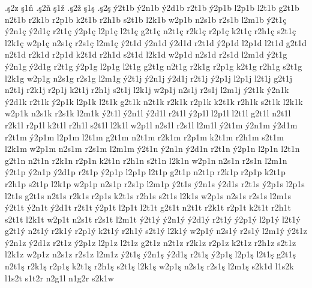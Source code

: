 {.ş2z
ş1ň
.ş2ň
ş1ž
.ş2ž
ş1ş
.ş2ş
ý2t1b
ý2n1b
ý2d1b
r2t1b
ý2p1b
l2p1b
l2t1b
g2t1b
n2t1b
r2k1b
r2p1b
k2t1b
r2h1b
s2t1b
l2k1b
w2p1b
n2s1b
r2s1b
l2m1b
ý2t1ç
ý2n1ç
ý2d1ç
r2t1ç
ý2p1ç
l2p1ç
l2t1ç
g2t1ç
n2t1ç
r2k1ç
r2p1ç
k2t1ç
r2h1ç
s2t1ç
l2k1ç
w2p1ç
n2s1ç
r2s1ç
l2m1ç
ý2t1d
ý2n1d
ý2d1d
r2t1d
ý2p1d
l2p1d
l2t1d
g2t1d
n2t1d
r2k1d
r2p1d
k2t1d
r2h1d
s2t1d
l2k1d
w2p1d
n2s1d
r2s1d
l2m1d
ý2t1g
ý2n1g
ý2d1g
r2t1g
ý2p1g
l2p1g
l2t1g
g2t1g
n2t1g
r2k1g
r2p1g
k2t1g
r2h1g
s2t1g
l2k1g
w2p1g
n2s1g
r2s1g
l2m1g
ý2t1j
ý2n1j
ý2d1j
r2t1j
ý2p1j
l2p1j
l2t1j
g2t1j
n2t1j
r2k1j
r2p1j
k2t1j
r2h1j
s2t1j
l2k1j
w2p1j
n2s1j
r2s1j
l2m1j
ý2t1k
ý2n1k
ý2d1k
r2t1k
ý2p1k
l2p1k
l2t1k
g2t1k
n2t1k
r2k1k
r2p1k
k2t1k
r2h1k
s2t1k
l2k1k
w2p1k
n2s1k
r2s1k
l2m1k
ý2t1l
ý2n1l
ý2d1l
r2t1l
ý2p1l
l2p1l
l2t1l
g2t1l
n2t1l
r2k1l
r2p1l
k2t1l
r2h1l
s2t1l
l2k1l
w2p1l
n2s1l
r2s1l
l2m1l
ý2t1m
ý2n1m
ý2d1m
r2t1m
ý2p1m
l2p1m
l2t1m
g2t1m
n2t1m
r2k1m
r2p1m
k2t1m
r2h1m
s2t1m
l2k1m
w2p1m
n2s1m
r2s1m
l2m1m
ý2t1n
ý2n1n
ý2d1n
r2t1n
ý2p1n
l2p1n
l2t1n
g2t1n
n2t1n
r2k1n
r2p1n
k2t1n
r2h1n
s2t1n
l2k1n
w2p1n
n2s1n
r2s1n
l2m1n
ý2t1p
ý2n1p
ý2d1p
r2t1p
ý2p1p
l2p1p
l2t1p
g2t1p
n2t1p
r2k1p
r2p1p
k2t1p
r2h1p
s2t1p
l2k1p
w2p1p
n2s1p
r2s1p
l2m1p
ý2t1s
ý2n1s
ý2d1s
r2t1s
ý2p1s
l2p1s
l2t1s
g2t1s
n2t1s
r2k1s
r2p1s
k2t1s
r2h1s
s2t1s
l2k1s
w2p1s
n2s1s
r2s1s
l2m1s
ý2t1t
ý2n1t
ý2d1t
r2t1t
ý2p1t
l2p1t
l2t1t
g2t1t
n2t1t
r2k1t
r2p1t
k2t1t
r2h1t
s2t1t
l2k1t
w2p1t
n2s1t
r2s1t
l2m1t
ý2t1ý
ý2n1ý
ý2d1ý
r2t1ý
ý2p1ý
l2p1ý
l2t1ý
g2t1ý
n2t1ý
r2k1ý
r2p1ý
k2t1ý
r2h1ý
s2t1ý
l2k1ý
w2p1ý
n2s1ý
r2s1ý
l2m1ý
ý2t1z
ý2n1z
ý2d1z
r2t1z
ý2p1z
l2p1z
l2t1z
g2t1z
n2t1z
r2k1z
r2p1z
k2t1z
r2h1z
s2t1z
l2k1z
w2p1z
n2s1z
r2s1z
l2m1z
ý2t1ş
ý2n1ş
ý2d1ş
r2t1ş
ý2p1ş
l2p1ş
l2t1ş
g2t1ş
n2t1ş
r2k1ş
r2p1ş
k2t1ş
r2h1ş
s2t1ş
l2k1ş
w2p1ş
n2s1ş
r2s1ş
l2m1ş
s2k1d
l1s2k
l1s2t
s1t2r
n2g1l
n1g2r
s2k1w
}
